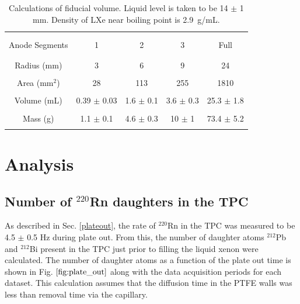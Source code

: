 \begin{table}[ht]
\centering
\begin{tabular}{ccccc}
\hline
\\[-5pt]
\\[-5pt]
 Anode Segments & 1 & 2 & 3 & Full \\
\\[-5pt]
\hline
\\[-5pt]
Radius (mm) & 3  & 6 & 9 & 24 \\
\\[-5pt]
Area (mm$^{2}$) & 28 &  113 & 255 & 1810 \\
\\[-5pt]
Volume (mL) & 0.39 $\pm$ 0.03 & 1.6 $\pm$ 0.1& 3.6 $\pm$ 0.3 & 25.3 $\pm$ 1.8 \\
\\[-5pt]
Mass (g) & 1.1 $\pm$ 0.1 & 4.6 $\pm$ 0.3 & 10 $\pm$ 1 & 73.4 $\pm$ 5.2  \\
\\[-5pt]

\hline
\end{tabular}
\caption{Calculations of fiducial volume. Liquid level is taken to be 14 $\pm$ 1 mm. Density of \ac{LXe} near boiling point is 2.9~g/mL.}
\label{T:fiducial}
\end{table}






\section{Analysis}
\label{S:3}
\subsection{Number of $^{220}$Rn daughters in the TPC}
As described in Sec. \ref{plateout}, the rate of $^{220}$Rn in the TPC was measured to be 4.5 $\pm$ 0.5 Hz during  plate out. From this, the number of daughter atoms $^{212}$Pb and $^{212}$Bi present in the TPC just prior to filling the liquid xenon were calculated. The number of daughter atoms as a function of the plate out time is shown in Fig. $\ref{fig:plate_out}$ along with the data acquisition periods for each dataset. This calculation assumes that the diffusion time in the PTFE walls was less than removal time via the capillary.


